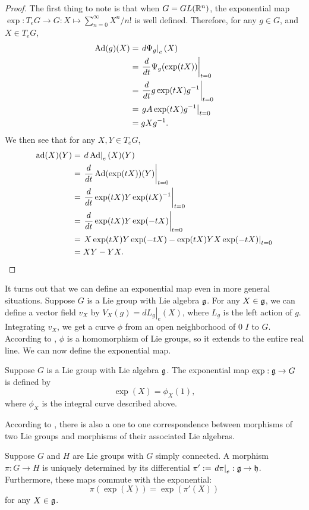\documentclass[a4paper]{article}
\begin{document}
\begin{proof}
The first thing to note is that when $G = GL(\mathbb{R}^n)$, the exponential map $\exp: T_e G \to G: X \mapsto \sum_{n=0}^{\infty} X^n/n!$ is well defined. Therefore, for any $g \in G$, and $X \in T_e G$,
\begin{align*}
\operatorname{Ad}(g)(X) &= \left. d\Psi_g \right|_e (X)\\
    &= \left. \frac{d}{dt} \Psi_g(\exp(tX)) \right|_{t=0} \\
    &= \left. \frac{d}{dt} g\exp(tX)g^{-1} \right|_{t=0} \\
    &= \left. gA \exp(t X)g^{-1} \right|_{t=0}\\
    &= gXg^{-1}.
\end{align*}
We then see that for any $X, Y \in T_e G$,
\begin{align*}
\operatorname{ad}(X)(Y) &= \left. d\operatorname{Ad} \right|_e (X)(Y)\\
    &= \left. \frac{d}{dt} \operatorname{Ad}(\exp(tX))(Y)\right|_{t=0} \\
    &= \left. \frac{d}{dt} \exp(tX)Y\exp(tX)^{-1}\right|_{t=0} \\
    &= \left. \frac{d}{dt} \exp(tX)Y\exp(-tX)\right|_{t=0} \\
    &= \left. X\exp(tX)Y\exp(-tX) - \exp(tX)Y X \exp(-tX)\right|_{t=0} \\
    &= XY - Y X.
\end{align*}
\end{proof}

It turns out that we can define an exponential map even in more general situations. Suppose $G$ is a Lie group with Lie algebra $\mathfrak{g}$. For any $X \in \mathfrak{g}$, we can define a vector field $v_{X}$ by $V_X(g) = \left. dL_g \right|_e (X)$, where $L_g$ is the left action of $g$. Integrating $v_X$, we get a curve $\phi$ from an open neighborhood of 0 $I$ to $G$. According to \cite{fulton_harris}, $\phi$ is a homomorphism of Lie groups, so it extends to the entire real line. We can now define the exponential map.
\begin{defi}
    Suppose $G$ is a Lie group with Lie algebra $\mathfrak{g}$. The exponential map $\exp : \mathfrak{g} \to G$ is defined by 
    $$\exp(X) = \phi_X(1),$$
    where $\phi_X$ is the integral curve described above. 
\end{defi}

According to \cite{fulton_harris}, there is also a one to one correspondence between morphisms of two Lie groups and morphisms of their associated Lie algebras.

\begin{prop}
    Suppose $G$ and $H$ are Lie groups with $G$ simply connected. A morphism $\pi: G \to H$ is uniquely determined by its differential $\pi' := \left. d\pi \right|_e : \mathfrak{g} \to \mathfrak{h}$. Furthermore, these maps commute with the exponential: 
    $$\pi(\exp(X)) = \exp(\pi'(X))$$
    for any $X \in \mathfrak{g}$.
\end{prop}
\end{document}
